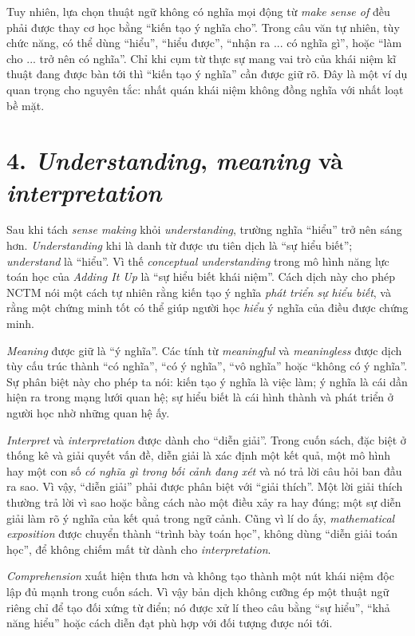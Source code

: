 Tuy nhiên, lựa chọn thuật ngữ không có nghĩa mọi động từ \emph{make sense of} đều phải được thay cơ học bằng ``kiến tạo ý nghĩa cho''. Trong câu văn tự nhiên, tùy chức năng, có thể dùng ``hiểu'', ``hiểu được'', ``nhận ra ... có nghĩa gì'', hoặc ``làm cho ... trở nên có nghĩa''. Chỉ khi cụm từ thực sự mang vai trò của khái niệm kĩ thuật đang được bàn tới thì ``kiến tạo ý nghĩa'' cần được giữ rõ. Đây là một ví dụ quan trọng cho nguyên tắc: nhất quán khái niệm không đồng nghĩa với nhất loạt bề mặt.

\section*{4. \emph{Understanding}, \emph{meaning} và \emph{interpretation}}

Sau khi tách \emph{sense making} khỏi \emph{understanding}, trường nghĩa ``hiểu'' trở nên sáng hơn. \emph{Understanding} khi là danh từ được ưu tiên dịch là ``sự hiểu biết''; \emph{understand} là ``hiểu''. Vì thế \emph{conceptual understanding} trong mô hình năng lực toán học của \emph{Adding It Up} là ``sự hiểu biết khái niệm''. Cách dịch này cho phép NCTM nói một cách tự nhiên rằng kiến tạo ý nghĩa \emph{phát triển sự hiểu biết}, và rằng một chứng minh tốt có thể giúp người học \emph{hiểu} ý nghĩa của điều được chứng minh.

\emph{Meaning} được giữ là ``ý nghĩa''. Các tính từ \emph{meaningful} và \emph{meaningless} được dịch tùy cấu trúc thành ``có nghĩa'', ``có ý nghĩa'', ``vô nghĩa'' hoặc ``không có ý nghĩa''. Sự phân biệt này cho phép ta nói: kiến tạo ý nghĩa là việc làm; ý nghĩa là cái dần hiện ra trong mạng lưới quan hệ; sự hiểu biết là cái hình thành và phát triển ở người học nhờ những quan hệ ấy.

\emph{Interpret} và \emph{interpretation} được dành cho ``diễn giải''. Trong cuốn sách, đặc biệt ở thống kê và giải quyết vấn đề, diễn giải là xác định một kết quả, một mô hình hay một con số \emph{có nghĩa gì trong bối cảnh đang xét} và nó trả lời câu hỏi ban đầu ra sao. Vì vậy, ``diễn giải'' phải được phân biệt với ``giải thích''. Một lời giải thích thường trả lời vì sao hoặc bằng cách nào một điều xảy ra hay đúng; một sự diễn giải làm rõ ý nghĩa của kết quả trong ngữ cảnh. Cũng vì lí do ấy, \emph{mathematical exposition} được chuyển thành ``trình bày toán học'', không dùng ``diễn giải toán học'', để không chiếm mất từ dành cho \emph{interpretation}.

\emph{Comprehension} xuất hiện thưa hơn và không tạo thành một nút khái niệm độc lập đủ mạnh trong cuốn sách. Vì vậy bản dịch không cưỡng ép một thuật ngữ riêng chỉ để tạo đối xứng từ điển; nó được xử lí theo câu bằng ``sự hiểu'', ``khả năng hiểu'' hoặc cách diễn đạt phù hợp với đối tượng được nói tới.

